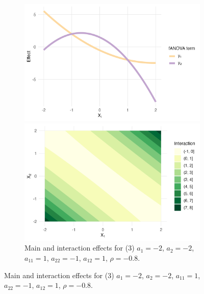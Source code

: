 \begin{figure}[htpb]
    \centering
    \begin{subfigure}[t]{\textwidth}
        \centering
        \begin{minipage}[t]{0.49\textwidth}
            \includegraphics[width=\textwidth]{images/experiment_section/full_a1m20_a2m20_a11p10_a22m10_a12p10_rhom08_main.png}
        \end{minipage}%
        \hfill
        \begin{minipage}[t]{0.49\textwidth}
            \includegraphics[width=\textwidth]{images/experiment_section/full_a1m20_a2m20_a11p10_a22m10_a12p10_rhom08_interaction.png}
        \end{minipage}
        \caption{Main and interaction effects for (3) $a_1 = -2$, $a_2 = -2$, 
                 $a_{11} = 1$, $a_{22} = -1$, $a_{12} = 1$, $\rho = -0.8$.}
    \end{subfigure}


\end{figure}
